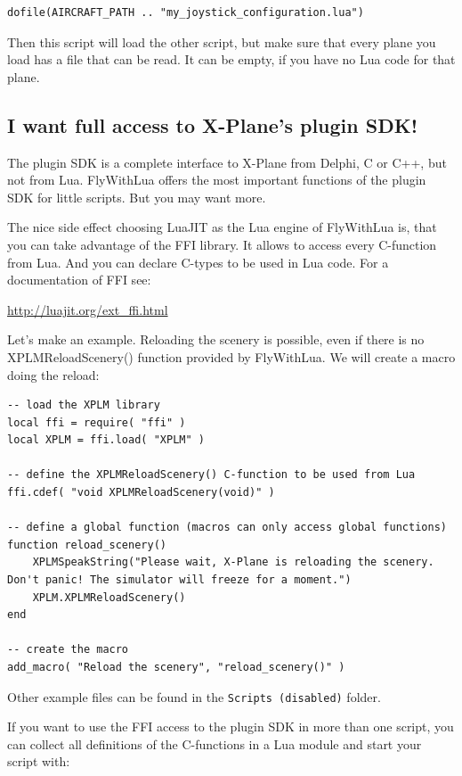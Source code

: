\documentclass[11pt,parskip=half,a4paper]{scrartcl}
\begin{document}
\begin{lstlisting}[firstnumber=1]
dofile(AIRCRAFT_PATH .. "my_joystick_configuration.lua")
\end{lstlisting}

Then this script will load the other script, but make sure that every plane you load has a file that can be read. It can be empty, if you have no Lua code for that plane.

\subsection{I want full access to X-Plane's plugin SDK!}

The plugin SDK is a complete interface to X-Plane from Delphi, C or C++, but not from Lua. FlyWithLua offers the most important functions of the plugin SDK for little scripts. But you may want more.

The nice side effect choosing LuaJIT as the Lua engine of FlyWithLua is, that you can take advantage of the FFI library. It allows to access every C-function from Lua. And you can declare C-types to be used in Lua code. For a documentation of FFI see:

\url{http://luajit.org/ext_ffi.html}

Let's make an example. Reloading the scenery is possible, even if there is no XPLMReloadScenery() function provided by FlyWithLua. We will create a macro doing the reload:

\begin{lstlisting}[firstnumber=12]
-- load the XPLM library
local ffi = require( "ffi" )
local XPLM = ffi.load( "XPLM" )

-- define the XPLMReloadScenery() C-function to be used from Lua
ffi.cdef( "void XPLMReloadScenery(void)" )

-- define a global function (macros can only access global functions)
function reload_scenery()
    XPLMSpeakString("Please wait, X-Plane is reloading the scenery. Don't panic! The simulator will freeze for a moment.")
    XPLM.XPLMReloadScenery()
end

-- create the macro
add_macro( "Reload the scenery", "reload_scenery()" )
\end{lstlisting}

Other example files can be found in the \verb|Scripts (disabled)| folder.

If you want to use the FFI access to the plugin SDK in more than one script, you can collect all definitions of the C-functions in a Lua module and start your script with:
\end{document}
